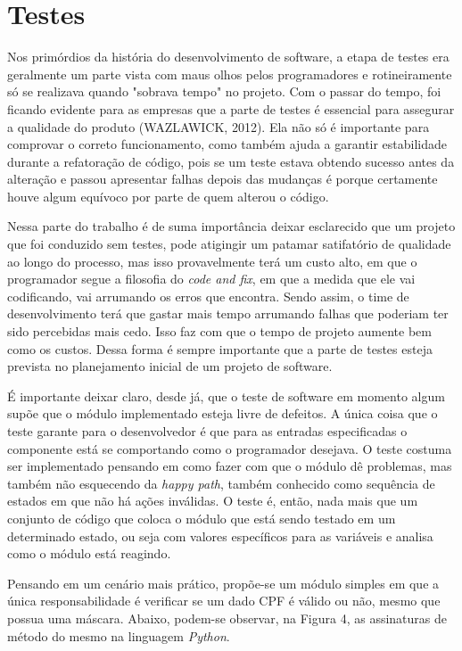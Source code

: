 \documentclass[
    12pt,       %
    openright,      %
    twoside,      %
    a4paper,      %
    english,      %
    french,       %
    spanish,      %
    brazil,       %
    ]{abntex2}
\begin{document}
  \chapter{Testes}
      Nos primórdios da história do desenvolvimento de software, a etapa de testes
      era geralmente um parte vista com maus olhos pelos programadores e rotineiramente
      só se realizava quando "sobrava tempo" no projeto. Com o passar do tempo, foi
      ficando evidente para as empresas que a parte de testes é essencial para
      assegurar a qualidade do produto (WAZLAWICK, 2012). Ela não só é importante
      para comprovar o correto funcionamento, como também ajuda a garantir
      estabilidade durante a refatoração de código, pois se um teste estava obtendo
      sucesso antes da alteração e passou apresentar falhas depois das mudanças é
      porque certamente houve algum equívoco por parte de quem alterou o código.

      Nessa parte do trabalho é de suma importância deixar esclarecido
      que um projeto que foi conduzido sem testes, pode atigingir um patamar
      satifatório de qualidade ao longo do processo, mas isso provavelmente terá um
      custo alto, em que o programador segue a filosofia do \textit{code and fix},
      em que a medida que ele vai codificando, vai arrumando os erros que encontra.
      Sendo assim, o time de desenvolvimento terá que gastar mais tempo arrumando
      falhas que poderiam ter sido percebidas mais cedo. Isso faz com que o tempo
      de projeto aumente bem como os custos. Dessa forma é sempre importante que
      a parte de testes esteja prevista no planejamento inicial de um projeto de software.

      É importante deixar claro, desde já, que o teste de software em momento
      algum supõe que o módulo implementado esteja livre de defeitos. A única coisa que o
      teste garante para o desenvolvedor é que para as entradas especificadas o
      componente está se comportando como o programador desejava. O teste costuma
      ser implementado pensando em como fazer com que o módulo dê problemas, mas
      também não esquecendo da \textit{happy path}, também conhecido como sequência
      de estados em que não há ações inválidas. O teste é, então, nada mais que um conjunto
      de código que coloca o módulo que está sendo testado em um determinado estado,
      ou seja com valores específicos para as variáveis e analisa como o módulo está
      reagindo.

      Pensando em um cenário mais prático, propõe-se um módulo simples em que a única
      responsabilidade é verificar se um dado CPF é válido ou não, mesmo que possua uma
      máscara. Abaixo, podem-se observar, na Figura 4, as assinaturas de método do
      mesmo na linguagem
      \textit{Python}.
\end{document}
